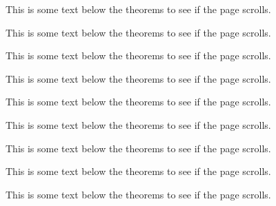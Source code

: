 \documentclass{ximera}
\begin{document}
This is some text below the theorems to see if the page scrolls.

This is some text below the theorems to see if the page scrolls.

This is some text below the theorems to see if the page scrolls.

This is some text below the theorems to see if the page scrolls.

This is some text below the theorems to see if the page scrolls.

This is some text below the theorems to see if the page scrolls.

This is some text below the theorems to see if the page scrolls.

This is some text below the theorems to see if the page scrolls.

This is some text below the theorems to see if the page scrolls.
\end{document}
